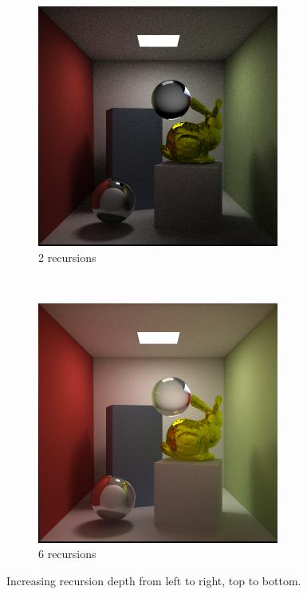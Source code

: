 \documentclass[a4paper, 12pt]{report}
\begin{document}
\begin{figure}
	\begin{subfigure}[h]{0.5\textwidth}
                \includegraphics[width=\textwidth]{figures/recursive_depth/recursion-3-100rpp.png}
                \caption{2 recursions}
                \label{fig:3rd}
        \end{subfigure}%
	~
	\begin{subfigure}[h]{0.5\textwidth}
                \includegraphics[width=\textwidth]{figures/recursive_depth/recursion-6-1000rpp.png}
                \caption{6 recursions}
                \label{fig:6rd}
        \end{subfigure}
        \caption{Increasing recursion depth from left to right, top to bottom.}\label{fig:recursion_depth}
\end{figure}
\end{document}
